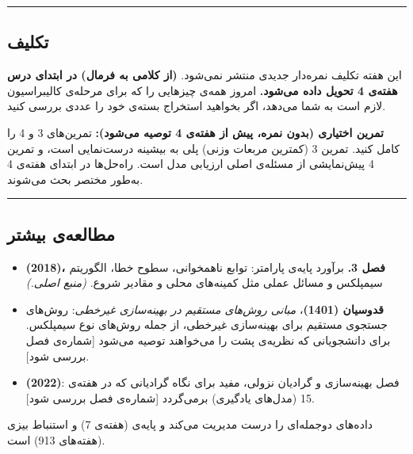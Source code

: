 \begin{center}\rule{0.5\linewidth}{0.5pt}\end{center}

\subsection{تکلیف}

این هفته تکلیف نمره‌دار جدیدی منتشر نمی‌شود. \textbf{ (از کلامی به
فرمال) در ابتدای درس هفته‌ی 4 تحویل داده می‌شود.}  امروز همه‌ی
چیزهایی را که برای مرحله‌ی کالیبراسیون  لازم است به شما می‌دهد، اگر
بخواهید استخراج بسته‌ی خود را عددی بررسی کنید.

\textbf{تمرین اختیاری (بدون نمره، پیش از هفته‌ی 4 توصیه می‌شود):} تمرین‌های
3 و 4  را کامل کنید. تمرین 3 (کمترین مربعات وزنی) پلی به بیشینه
درست‌نمایی است، و تمرین 4 پیش‌نمایشی از مسئله‌ی اصلی ارزیابی مدل است.
راه‌حل‌ها در ابتدای  هفته‌ی 4 به‌طور مختصر بحث می‌شوند.

\begin{center}\rule{0.5\linewidth}{0.5pt}\end{center}

\subsection{مطالعه‌ی بیشتر}

\begin{itemize}
\tightlist
\item
  \textbf{ \lr{\&}  (2018)، فصل 3.} برآورد پایه‌ی
  پارامتر: توابع ناهمخوانی، سطوح خطا، الگوریتم سیمپلکس و مسائل عملی مثل
  کمینه‌های محلی و مقادیر شروع. \emph{(منبع اصلی.)}
\item
  \textbf{قدوسیان (1401)}، \emph{مبانی روش‌های مستقیم در بهینه‌سازی
  غیرخطی}: روش‌های جستجوی مستقیم برای بهینه‌سازی غیرخطی، از جمله روش‌های
  نوع سیمپلکس. برای دانشجویانی که نظریه‌ی پشت  را
  می‌خواهند توصیه می‌شود {[}شماره‌ی فصل بررسی شود{]}.
\item
  \textbf{ (2022)}: فصل بهینه‌سازی و گرادیان نزولی، مفید برای
  نگاه گرادیانی که در هفته‌ی 15 (مدل‌های یادگیری) برمی‌گردد {[}شماره‌ی فصل
  بررسی شود{]}.
\end{itemize}

داده‌های دوجمله‌ای را درست مدیریت می‌کند و پایه‌ی  (هفته‌ی 7) و
استنباط بیزی (هفته‌های 9\lr{--}13) است.
